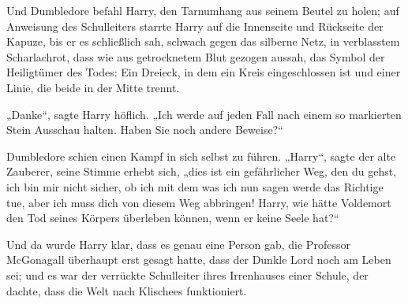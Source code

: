 Und Dumbledore befahl Harry, den Tarnumhang aus seinem Beutel zu holen; auf Anweisung des Schulleiters starrte Harry auf die Innenseite und Rückseite der Kapuze, bis er es schließlich sah, schwach gegen das silberne Netz, in verblasstem Scharlachrot, dass wie aus getrocknetem Blut gezogen aussah, das Symbol der Heiligtümer des Todes: Ein Dreieck, in dem ein Kreis eingeschlossen ist und einer Linie, die beide in der Mitte trennt.

„Danke“, sagte Harry höflich. „Ich werde auf jeden Fall nach einem so markierten Stein Ausschau halten. Haben Sie noch andere Beweise?“

Dumbledore schien einen Kampf in sich selbst zu führen. „Harry“, sagte der alte Zauberer, seine Stimme erhebt sich, „dies ist ein gefährlicher Weg, den du gehst, ich bin mir nicht sicher, ob ich mit dem was ich nun sagen werde das Richtige tue, aber ich muss dich von diesem Weg abbringen! Harry, wie hätte Voldemort den Tod seines Körpers überleben können, wenn er keine Seele hat?“

Und da wurde Harry klar, dass es genau eine Person gab, die Professor McGonagall überhaupt erst gesagt hatte, dass der Dunkle Lord noch am Leben sei; und es war der verrückte Schulleiter ihres Irrenhauses einer Schule, der dachte, dass die Welt nach Klischees funktioniert.

